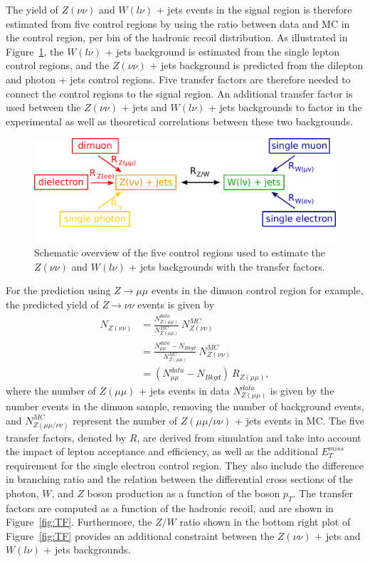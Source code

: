The yield of $Z(\nu\nu)$ and $W(l\nu)$ + jets events in the signal region is therefore estimated from five control regions by using the ratio between data and MC in the control region, per bin of the hadronic recoil distribution. As illustrated in Figure~\ref{fig:CR}, the $W(l\nu)$ + jets background is estimated from the single lepton control regions, and the $Z(\nu\nu)$ + jets background is predicted from the dilepton and photon + jets control regions. Five transfer factors are therefore needed to connect the control regions to the signal region. An additional transfer factor is used between the $Z(\nu\nu)$ + jets and $W(l\nu)$ + jets backgrounds to factor in the experimental as well as theoretical correlations between these two backgrounds. 

\begin{figure}[ht]
  \centering
 \includegraphics[width=\textwidth]{bkgd_estimation.pdf} 
 \caption{Schematic overview of the five control regions used to estimate the $Z(\nu\nu)$ and $W(l\nu)$ + jets backgrounds with the transfer factors.}
 \label{fig:CR}
\end{figure}

For the prediction using $Z\rightarrow \mu\mu$ events in the dimuon control region for example, the predicted yield of $Z\rightarrow\nu\nu$ events is given by
\begin{align}
 N_{Z(\nu\nu)} &= \frac{N_{Z(\mu\mu)}^{data}}{N_{Z(\mu\mu)}^{MC}}\ N_{Z(\nu\nu)}^{MC}\\
 &= \frac{N_{\mu\mu}^{data} - N_{Bkgd}}{N_{Z(\mu\mu)}^{MC}}\ N_{Z(\nu\nu)}^{MC} \\
 &= \left(N_{\mu\mu}^{data} - N_{Bkgd}\right)\ R_{Z(\mu\mu)},
\end{align}
where the number of $Z(\mu\mu)$ + jets events in data $N_{Z(\mu\mu)}^{data}$ is given by the number events in the dimuon sample, removing the number of background events, and $N_{Z(\mu\mu/\nu\nu)}^{MC}$ represent the number of $Z(\mu\mu/\nu\nu)$ + jets events in MC. The five transfer factors, denoted by $R$, are derived from simulation and take into account the impact of lepton acceptance and efficiency, as well as the additional $E_T^{miss}$ requirement for the single electron control region. They also include the difference in branching ratio and the relation between the differential cross sections of the photon, $W$, and $Z$ boson production as a function of the boson $p_T$. The transfer factors are computed as a function of the hadronic recoil, and are shown in Figure~\ref{fig:TF}. Furthermore, the $Z/W$ ratio shown in the bottom right plot of Figure~\ref{fig:TF} provides an additional constraint between the $Z(\nu\nu)$ + jets and $W(l\nu)$ + jets backgrounds.

